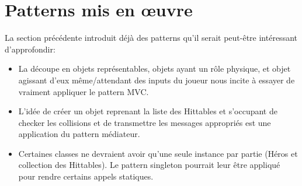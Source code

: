 \documentclass[a4paper, 12pt]{article}
\begin{document}

\section{Patterns mis en \oe{}uvre}

La section précédente introduit déjà des patterns qu'il serait peut-être intéressant d'approfondir:
\begin{itemize}
  \item La découpe en objets représentables, objets ayant un rôle physique, et objet agissant d'eux même/attendant des inputs du joueur nous incite à essayer de vraiment appliquer le pattern MVC.
  \item L'idée de créer un objet reprenant la liste des Hittables et s'occupant de checker les collisions et de transmettre les messages appropriés est une application du pattern médiateur.
  \item Certaines classes ne devraient avoir qu'une seule instance par partie (Héros et collection des Hittables). Le pattern singleton pourrait leur être appliqué pour rendre certains appels statiques.
\end{itemize}
\end{document}
